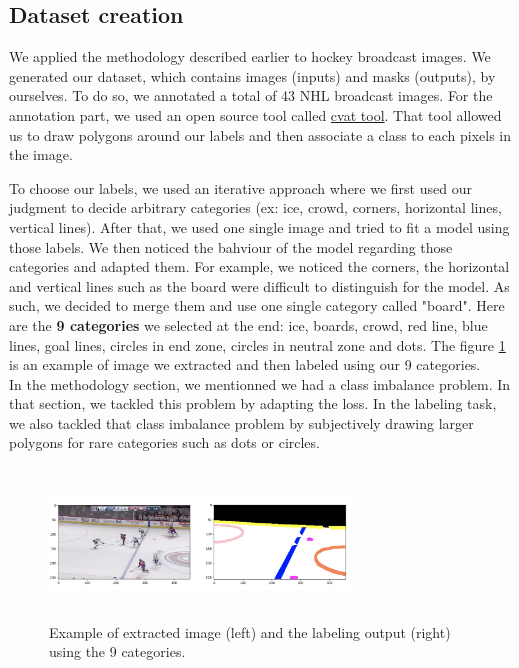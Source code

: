 \subsection{Dataset creation}
We applied the methodology described earlier to hockey broadcast images. We generated our dataset, which contains images (inputs) and masks (outputs), by ourselves. To do so, we annotated a total of 43 NHL broadcast images. For the annotation part, we used an open source tool called \href{https://github.com/opencv/cvat}{cvat tool}. That tool allowed us to draw polygons around our labels and then associate a class to each pixels in the image.

To choose our labels, we used an iterative approach where we first used our judgment to decide arbitrary categories (ex: ice, crowd, corners, horizontal lines, vertical lines). After that, we used one single image and tried to fit a model using those labels. We then noticed the bahviour of the model regarding those categories and adapted them. For example, we noticed the corners, the horizontal and vertical lines such as the board were difficult to distinguish for the model. As such, we decided to merge them and use one single category called "board". Here are the \textbf{9 categories} we selected at the end: ice, boards, crowd, red line, blue lines, goal lines, circles in end zone, circles in neutral zone and dots. The figure \ref{fig:labeling} is an example of image we extracted and then labeled using our 9 categories. \\

In the methodology section, we mentionned we had a class imbalance problem. In that section, we tackled this problem by adapting the loss. In the labeling task, we also tackled that class imbalance problem by subjectively drawing larger polygons for rare categories such as dots or circles.

\begin{figure}[H]
	\centering
	\includegraphics[width=8cm, height=4cm]{figures/labeling-example.png}
	\caption{Example of extracted image (left) and the labeling output (right) using the 9 categories.}
	\label{fig:labeling}
\end{figure}
